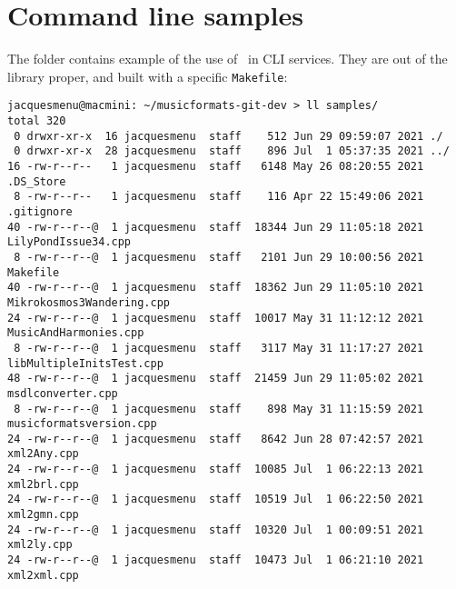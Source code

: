 



\chapter{Command line samples}

The  folder contains example of the use of \mf\ in CLI services. They are out of the library proper, and built with a specific {\tt Makefile}:
\begin{lstlisting}[language=Terminal]
jacquesmenu@macmini: ~/musicformats-git-dev > ll samples/
total 320
 0 drwxr-xr-x  16 jacquesmenu  staff    512 Jun 29 09:59:07 2021 ./
 0 drwxr-xr-x  28 jacquesmenu  staff    896 Jul  1 05:37:35 2021 ../
16 -rw-r--r--   1 jacquesmenu  staff   6148 May 26 08:20:55 2021 .DS_Store
 8 -rw-r--r--   1 jacquesmenu  staff    116 Apr 22 15:49:06 2021 .gitignore
40 -rw-r--r--@  1 jacquesmenu  staff  18344 Jun 29 11:05:18 2021 LilyPondIssue34.cpp
 8 -rw-r--r--@  1 jacquesmenu  staff   2101 Jun 29 10:00:56 2021 Makefile
40 -rw-r--r--@  1 jacquesmenu  staff  18362 Jun 29 11:05:10 2021 Mikrokosmos3Wandering.cpp
24 -rw-r--r--@  1 jacquesmenu  staff  10017 May 31 11:12:12 2021 MusicAndHarmonies.cpp
 8 -rw-r--r--@  1 jacquesmenu  staff   3117 May 31 11:17:27 2021 libMultipleInitsTest.cpp
48 -rw-r--r--@  1 jacquesmenu  staff  21459 Jun 29 11:05:02 2021 msdlconverter.cpp
 8 -rw-r--r--@  1 jacquesmenu  staff    898 May 31 11:15:59 2021 musicformatsversion.cpp
24 -rw-r--r--@  1 jacquesmenu  staff   8642 Jun 28 07:42:57 2021 xml2Any.cpp
24 -rw-r--r--@  1 jacquesmenu  staff  10085 Jul  1 06:22:13 2021 xml2brl.cpp
24 -rw-r--r--@  1 jacquesmenu  staff  10519 Jul  1 06:22:50 2021 xml2gmn.cpp
24 -rw-r--r--@  1 jacquesmenu  staff  10320 Jul  1 00:09:51 2021 xml2ly.cpp
24 -rw-r--r--@  1 jacquesmenu  staff  10473 Jul  1 06:21:10 2021 xml2xml.cpp
\end{lstlisting}

